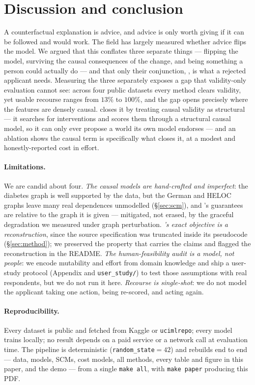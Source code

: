 \section{Discussion and conclusion}
\label{sec:conclusion}

A counterfactual explanation is advice, and advice is only worth giving if it can
be followed and would work. The field has largely measured whether advice flips
the model. We argued that this conflates three separate things --- flipping the
model, surviving the causal consequences of the change, and being something a
person could actually do --- and that only their conjunction, \Usable{}, is what a
rejected applicant needs. Measuring the three separately exposes a gap that
validity-only evaluation cannot see: across four public datasets every method
clears validity, yet usable recourse ranges from $13\%$ to $100\%$, and the gap
opens precisely where the features are densely causal. \cac{} closes it by
treating causal validity as structural --- it searches for interventions and
scores them through a structural causal model, so it can only ever propose a world
its own model endorses --- and an ablation shows the causal term is specifically
what closes it, at a modest and honestly-reported cost in effort.

\paragraph{Limitations.} We are candid about four. \emph{The causal models are
hand-crafted and imperfect}: the diabetes graph is well supported by the data, but
the German and HELOC graphs leave many real dependences unmodelled
(\S\ref{sec:scm}), and \cac{}'s guarantees are relative to the graph it is given
--- mitigated, not erased, by the graceful degradation we measured under graph
perturbation. \emph{\cac{}'s exact objective is a reconstruction}, since the source
specification was truncated inside its pseudocode (\S\ref{sec:method}); we
preserved the property that carries the claims and flagged the reconstruction in
the README. \emph{The human-feasibility audit is a model, not people}: we encode
mutability and effort from domain knowledge and ship a user-study protocol
(Appendix and \texttt{user\_study/}) to test those assumptions with real
respondents, but we do not run it here. \emph{Recourse is single-shot}: we do not
model the applicant taking one action, being re-scored, and acting again.

\paragraph{Reproducibility.} Every dataset is public and fetched from Kaggle or
\texttt{ucimlrepo}; every model trains locally; no result depends on a paid
service or a network call at evaluation time. The pipeline is deterministic
(\texttt{random\_state}$=42$) and rebuilds end to end --- data, models, SCMs, cost
models, all methods, every table and figure in this paper, and the demo --- from a
single \texttt{make all}, with \texttt{make paper} producing this PDF.

